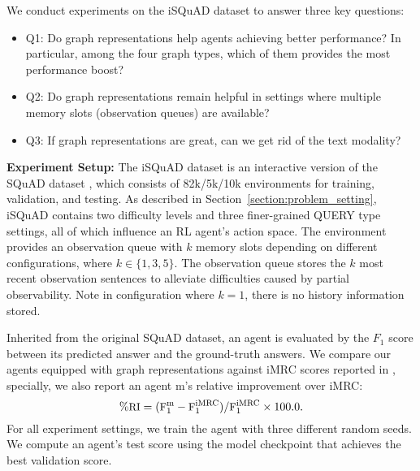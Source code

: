 \documentclass[11pt]{article}
\newcommand{\isquad}{iSQuAD\xspace}
\newcommand{\imrc}{iMRC\xspace}
\newcommand{\squad}{SQuAD\xspace}
\newcommand{\query}{\textcolor{orange2}{\small{QUERY}}\xspace}
\begin{document}
We conduct experiments on the \isquad dataset \citep{yuan2020imrc} to answer three key questions:
\begin{itemize}
    \item Q1: Do graph representations help agents achieving better performance? In particular, among the four graph types, which of them provides the most performance boost?
    \item Q2: Do graph representations remain helpful in settings where multiple memory slots (observation queues) are available?
    \item Q3: If graph representations are great, can we get rid of the text modality?
\end{itemize}


\textbf{Experiment Setup:}
The \isquad dataset \citep{yuan2020imrc} is an interactive version of the \squad dataset \citep{rajpurkar16squad}, which consists of 82k/5k/10k environments for training, validation, and testing.
As described in Section~\ref{section:problem_setting}, \isquad contains two difficulty levels and three finer-grained \query type settings, all of which influence an RL agent's action space.
The environment provides an observation queue with $k$ memory slots depending on different configurations, where $k \in \{1, 3, 5\}$. 
The observation queue stores the $k$ most recent observation sentences to alleviate difficulties caused by partial observability.
Note in configuration where $k=1$, there is no history information stored.

Inherited from the original \squad dataset, an agent is evaluated by the $F_1$ score between its predicted answer and the ground-truth answers.
We compare our agents equipped with graph representations against \imrc scores reported in \citep{yuan2020imrc}, specially, we also report an agent m's relative improvement over \imrc:
\begin{equation}
    \small
    \%\text{RI} = (\text{F}_{1}^{\text{m}} - \text{F}_{1}^{\text{\imrc}}) / \text{F}_{1}^{\text{\imrc}} \times 100.0.
\end{equation}
For all experiment settings, we train the agent with three different random seeds.
We compute an agent's test score using the model checkpoint that achieves the best validation score.


\end{document}
